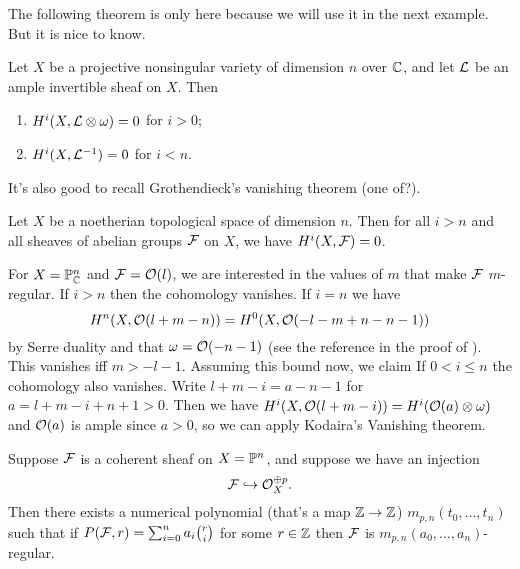 The following theorem is only here because we will use it in the next example. But it is nice to know. 
\begin{theorem}
	Let $X$ be a projective nonsingular variety of dimension $n$ over $\mathbb{C}$, and let $\mathcal{L}$ be an ample invertible sheaf on $X$. Then \begin{enumerate}
    	\item $H^i(X, \mathcal{L}\otimes \omega) = 0$ for $i > 0$;
		\item $H^i(X, \mathcal{L}^{-1}) = 0$ for $i < n$. 
    \end{enumerate}
\end{theorem}
It's also good to recall Grothendieck's vanishing theorem (one of?).
\begin{theorem}
	Let $X$ be a noetherian topological space of dimension $n$. Then for all $i > n$ and all sheaves of abelian groups $\mathcal{F}$ on $X$, we have $H^i(X, \mathcal{F}) = 0$. 	
\end{theorem}

\begin{example}
	For $X = \mathbb{P}^n_{\mathbb{C}}$ and $\mathcal{F} = \mathcal{O}(l)$, 
	we are interested in the values of $m$ that make $\mathcal{F}$ $m$-regular. If $i > n$ then the cohomology vanishes. 
	If $i = n$ we have \[
    	H^n(X, \mathcal{O}(l + m - n)) = H^0(X, \mathcal{O}(-l-m + n -n-1))
    \]
	by Serre duality and that $\omega = \mathcal{O}(-n-1)$ (see the reference in the proof of \cite[Theorem~III.7.1]{hartshorne2013algebraic}).
	This vanishes iff $m > -l-1$. Assuming this bound now, we claim 
	If $0 < i \leq n$ the cohomology also vanishes.
	Write $l + m - i = a - n - 1$ for $a = l+m-i+n+1 > 0$. 
	Then we have $H^i(X, \mathcal{O}(l+m-i)) = H^i(\mathcal{O}(a) \otimes \omega)$ and $\mathcal{O}(a)$ is ample since $a > 0$, so we can apply Kodaira's Vanishing theorem.
\end{example}

\begin{theorem}
	Suppose $\mathcal{F}$ is a coherent sheaf on $X = \mathbb{P}^n$, and suppose we have an injection \[
    	\mathcal{F} \hookrightarrow \mathcal{O}_X^{\oplus p}.
    \] Then there exists a numerical polynomial (that's a map $\mathbb{Z} \to \mathbb{Z}$) $m_{p,n}(t_0, \dots, t_n)$ such that if $P(\mathcal{F}, r) = \sum^n_{i=0}a_i {r \choose i}$ for some $r \in \mathbb{Z}$ then $\mathcal{F}$ is $m_{p, n}(a_0, \dots, a_n)$-regular.
\end{theorem}

